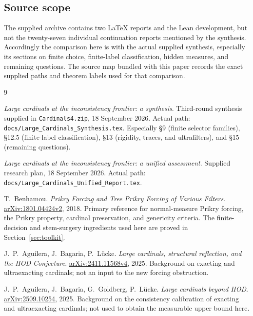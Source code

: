 \documentclass[11pt,letterpaper]{article}
\theoremstyle{definition}
\numberwithin{equation}{section}
\newcommand{\arxiv}[1]{\href{https://arxiv.org/abs/#1}{arXiv:#1}}
\begin{document}
\subsection{Source scope}

The supplied archive contains two LaTeX reports and the Lean development, but not the twenty-seven individual continuation reports mentioned by the synthesis. Accordingly the comparison here is with the actual supplied synthesis, especially its sections on finite choice, finite-label classification, hidden measures, and remaining questions. The source map bundled with this paper records the exact supplied paths and theorem labels used for that comparison.

\clearpage
{}
{}
\begin{thebibliography}{9}
\small
\setlength{\itemsep}{6pt}

\emph{Large cardinals at the inconsistency frontier: a synthesis}.
Third-round synthesis supplied in \nolinkurl{Cardinals4.zip}, 18 September 2026.
Actual path: \nolinkurl{docs/Large_Cardinals_Synthesis.tex}.
Especially \S9 (finite selector families), \S12.5 (finite-label classification),
\S13 (rigidity, traces, and ultrafilters), and \S15 (remaining questions).

\emph{Large cardinals at the inconsistency frontier: a unified assessment}.
Supplied research plan, 18 September 2026.
Actual path: \nolinkurl{docs/Large_Cardinals_Unified_Report.tex}.

T.~Benhamou.
\emph{Prikry Forcing and Tree Prikry Forcing of Various Filters}.
\arxiv{1801.04424v2}, 2018.
Primary reference for normal-measure Prikry forcing, the Prikry property,
cardinal preservation, and genericity criteria. The finite-decision and
stem-surgery ingredients used here are proved in Section~\ref{sec:toolkit}.

J.~P.~Aguilera, J.~Bagaria, P.~L\"ucke.
\emph{Large cardinals, structural reflection, and the HOD Conjecture}.
\arxiv{2411.11568v4}, 2025.
Background on exacting and ultraexacting cardinals; not an input to the new forcing obstruction.

J.~P.~Aguilera, J.~Bagaria, G.~Goldberg, P.~L\"ucke.
\emph{Large cardinals beyond HOD}.
\arxiv{2509.10254}, 2025.
Background on the consistency calibration of exacting and ultraexacting cardinals; not used to obtain the measurable upper bound here.

\end{thebibliography}
\end{document}
